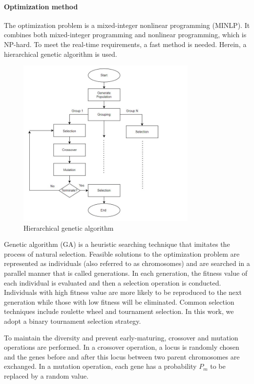 \documentclass[12pt,journal,draftclsnofoot,onecolumn]{IEEEtran}
\begin{document}
\paragraph{Optimization method}
The optimization problem is a mixed-integer nonlinear programming (MINLP). It combines both mixed-integer programming and nonlinear programming, which is NP-hard. To meet the real-time requirements, a fast method is needed. Herein, a hierarchical genetic algorithm is used.

\begin{figure}[H]
	\centering
	\includegraphics[width=3.5in]{GA.jpg}
	\caption{Hierarchical genetic algorithm}
	\label{fig:ga}
\end{figure}

Genetic algorithm (GA) is a heuristic searching technique that imitates the process of natural selection. Feasible solutions to the optimization problem are represented as individuals (also referred to as chromosomes) and are searched in a parallel manner that is called generations. In each generation, the fitness value of each individual is evaluated and then a selection operation is conducted. Individuals with high fitness value are more likely to be reproduced to the next generation while those with low fitness will be eliminated. Common selection techniques include roulette wheel and tournament selection. In this work, we adopt a binary tournament selection strategy.

To maintain the diversity and prevent early-maturing, crossover and mutation operations are performed. In a crossover operation, a locus is randomly chosen and the genes before and after this locus between two parent chromosomes are exchanged. In a mutation operation, each gene has a probability $P_m$ to be replaced by a random value.
\end{document}
